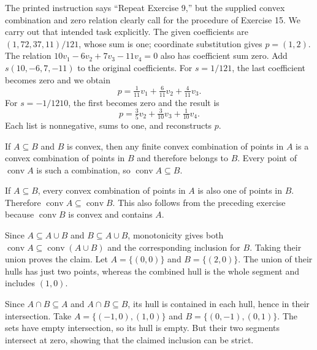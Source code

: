 The printed instruction says ``Repeat Exercise 9,'' but the supplied
convex combination and zero relation clearly call for the procedure of
Exercise 15. We carry out that intended task explicitly.
The given coefficients are $(1,72,37,11)/121$, whose sum is one;
coordinate substitution gives $p=(1,2)$. The relation
$10v_1-6v_2+7v_3-11v_4=0$ also has coefficient sum zero.
Add $s(10,-6,7,-11)$ to the original coefficients.
For $s=1/121$, the last coefficient becomes zero and we obtain
\[
 p=\tfrac1{11}v_1+\tfrac6{11}v_2+\tfrac4{11}v_3.
\]
For $s=-1/1210$, the first becomes zero and the result is
\[
 p=\tfrac35v_2+\tfrac3{10}v_3+\tfrac1{10}v_4.
\]
Each list is nonnegative, sums to one, and reconstructs $p$.

If $A\subseteq B$ and $B$ is convex, then any finite convex combination
of points in $A$ is a convex combination of points in $B$ and therefore
belongs to $B$. Every point of $\operatorname{conv}A$ is such a combination,
so $\operatorname{conv}A\subseteq B$.

If $A\subseteq B$, every convex combination of points in $A$ is also one
of points in $B$. Therefore $\operatorname{conv}A\subseteq\operatorname{conv}B$.
This also follows from the preceding exercise because $\operatorname{conv}B$
is convex and contains $A$.

Since $A\subseteq A\cup B$ and $B\subseteq A\cup B$, monotonicity gives
both $\operatorname{conv}A\subseteq\operatorname{conv}(A\cup B)$ and
the corresponding inclusion for $B$. Taking their union proves the claim.
Let $A=\{(0,0)\}$ and $B=\{(2,0)\}$.
The union of their hulls has just two points, whereas the combined hull is
the whole segment and includes $(1,0)$.

Since $A\cap B\subseteq A$ and $A\cap B\subseteq B$, its hull is
contained in each hull, hence in their intersection.
Take $A=\{(-1,0),(1,0)\}$ and $B=\{(0,-1),(0,1)\}$.
The sets have empty intersection, so its hull is empty. But their two
segments intersect at zero, showing that the claimed inclusion can be strict.

